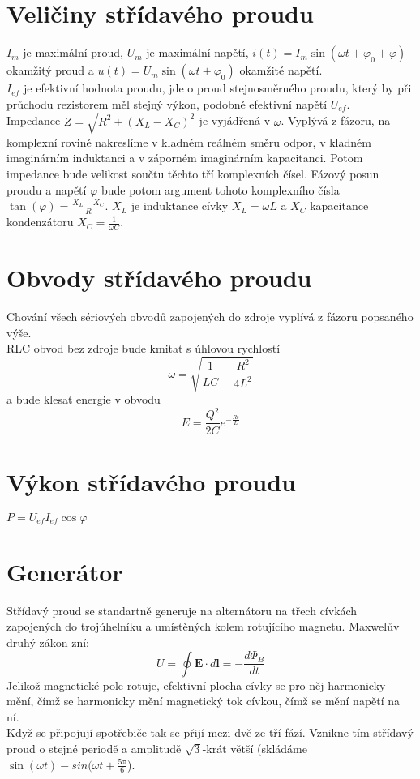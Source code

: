 \documentclass[titlepage]{report}
\begin{document}
\section{Veličiny střídavého proudu}
$I_m$ je maximální proud, $U_m$ je maximální napětí, $i(t) = I_m \sin(\omega t + \varphi_0 + \varphi)$ okamžitý proud a $u(t) = U_m \sin(\omega t + \varphi_0)$ okamžité napětí.\\
$I_{ef}$ je efektivní hodnota proudu, jde o proud stejnosměrného proudu, který by při průchodu rezistorem měl stejný výkon, podobně efektivní napětí $U_{ef}$.\\
Impedance $Z = \sqrt{R^2 + (X_L - X_C)^2}$ je vyjádřená v $\omega$. Vyplývá z fázoru, na komplexní rovině nakreslíme v kladném reálném směru odpor, v kladném imaginárním induktanci a v záporném imaginárním kapacitanci. Potom impedance bude velikost součtu těchto tří komplexních čísel. Fázový posun proudu a napětí $\varphi$ bude potom argument tohoto komplexního čísla $\tan(\varphi) = \frac{X_L - X_C}{R}$. $X_L$ je induktance cívky $X_L = \omega L$ a $X_C$ kapacitance kondenzátoru $X_C = \frac{1}{\omega C}$.\\
\section{Obvody střídavého proudu}
Chování všech sériových obvodů zapojených do zdroje vyplívá z fázoru popsaného výše.\\
RLC obvod bez zdroje bude kmitat s úhlovou rychlostí\\
\begin{equation}
\omega = \sqrt{\frac{1}{LC} - \frac{R^2}{4L^2}}
\end{equation}
a bude klesat energie v obvodu\\
\begin{equation}
E=\frac{Q^2}{2C}e^{-\frac{Rt}{L}}
\end{equation}
\section{Výkon střídavého proudu}
$P = U_{ef}I_{ef}\cos \varphi$
\section{Generátor} \label{sec:generator}
Střídavý proud se standartně generuje na alternátoru na třech cívkách zapojených do trojúhelníku a umístěných kolem rotujícího magnetu. Maxwelův druhý zákon zní:\\
\begin{equation}
U = \oint \boldsymbol E \cdot d \boldsymbol l = -\frac{d\Phi_B}{dt}
\end{equation}
Jelikož magnetické pole rotuje, efektivní plocha cívky se pro něj harmonicky mění, čímž se harmonicky mění magnetický tok cívkou, čímž se mění napětí na ní.\\
Když se připojují spotřebiče tak se přijí mezi dvě ze tří fází. Vznikne tím střídavý proud o stejné periodě a amplitudě $\sqrt{3}$-krát větší (skládáme $\sin(\omega t) - sin(\omega t + \frac{5\pi}{6}$).
\end{document}
